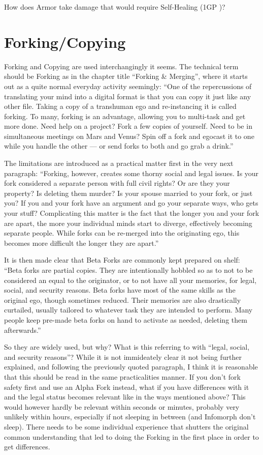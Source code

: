 How does Armor take damage that would require Self-Healing (1GP \citep[p. 217]{ep2e_1.1_2019})?


\section{Forking/Copying}

Forking and Copying are used interchangingly it seems. The technical term should be Forking as in the chapter title “Forking \& Merging”, where it starts out as a quite normal everyday activity seemingly: “One of the repercussions of translating your mind into a digital format is that you can copy it just like any other file. Taking a copy of a transhuman ego and re-instancing it is called forking. To many, forking is an advantage, allowing you to multi-task and get more done. Need help on a project? Fork a few copies of yourself. Need to be in simultaneous meetings on Mars and Venus? Spin off a fork and egocast it to one while you handle the other — or send forks to both and go grab a drink.” \citep[pg. 292]{ep2e_1.1_2019}

The limitations are introduced as a practical matter first in the very next paragraph: “Forking, however, creates some thorny social and legal issues. Is your fork considered a separate person with full civil rights? Or are they your property? Is deleting them murder? Is your spouse married to your fork, or just you? If you and your fork have an argument and go your separate ways, who gets your stuff? Complicating this matter is the fact that the longer you and your fork are apart, the more your individual minds start to diverge, effectively becoming separate people. While forks can be re-merged into the originating ego, this becomes more difficult the longer they are apart.” \citep[pg. 292]{ep2e_1.1_2019}

It is then made clear that Beta Forks are commonly kept prepared on shelf: “Beta forks are partial copies. They are intentionally hobbled so as to not to be considered an equal to the originator, or to not have all your memories, for legal, social, and security reasons. Beta forks have most of the same skills as the original ego, though sometimes reduced. Their memories are also drastically curtailed, usually tailored to whatever task they are intended to perform. Many people keep pre-made beta forks on hand to activate as needed, deleting them afterwards.” \citep[pg. 292]{ep2e_1.1_2019}

So they are widely used, but why? What is this referring to with “legal, social, and security reasons”? While it is not immideately clear it not being further explained, and following the previously quoted paragraph, I think it is reasonable that this should be read in the same practicalities manner. If you don't fork safety first and use an Alpha Fork instead, what if you have differences with it and the legal status becomes relevant like in the ways mentioned above? This would however hardly be relevant within seconds or minutes, probably very unlikely within hours, especially if not sleeping in between (and Infomorph don't sleep). There needs to be some individual experience that shutters the original common understanding that led to doing the Forking in the first place in order to get differences.

